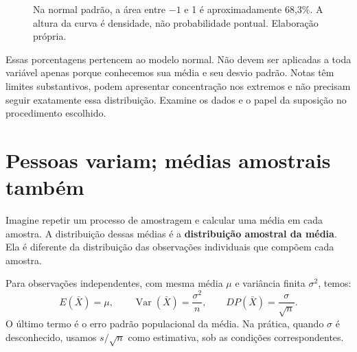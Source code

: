 \begin{figure}[H]
\centering
{}
\caption{Na normal padrão, a área entre $-1$ e 1 é aproximadamente 68,3\%. A altura da curva é densidade, não probabilidade pontual. Elaboração própria.}
\label{fig:normal-area}
\end{figure}

Essas porcentagens pertencem ao modelo normal. Não devem ser aplicadas a toda variável apenas porque conhecemos sua média e seu desvio padrão. Notas têm limites substantivos, podem apresentar concentração nos extremos e não precisam seguir exatamente essa distribuição. Examine os dados e o papel da suposição no procedimento escolhido.

\section{Pessoas variam; médias amostrais também}
\label{sec:distribuicao-amostral}

Imagine repetir um processo de amostragem e calcular uma média em cada amostra. A distribuição dessas médias é a \textbf{distribuição amostral da média}. Ela é diferente da distribuição das observações individuais que compõem cada amostra.

Para observações independentes, com mesma média $\mu$ e variância finita $\sigma^2$, temos:
\[
E(\bar{X})=\mu,\qquad
\operatorname{Var}(\bar{X})=\frac{\sigma^2}{n},\qquad
DP(\bar{X})=\frac{\sigma}{\sqrt{n}}.
\]
O último termo é o erro padrão populacional da média. Na prática, quando $\sigma$ é desconhecido, usamos $s/\sqrt{n}$ como estimativa, sob as condições correspondentes.


